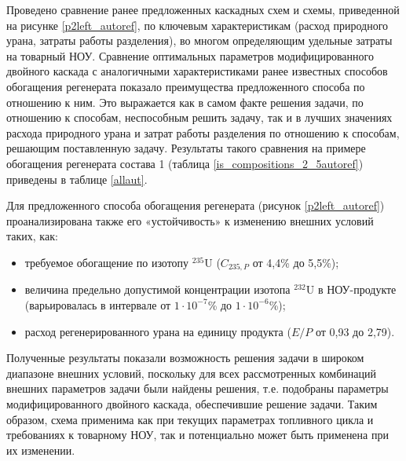 Проведено сравнение ранее предложенных каскадных схем и схемы, приведенной на рисунке \ref{p2left_autoref}, по ключевым характеристикам (расход природного урана, затраты работы разделения), во многом определяющим удельные затраты на товарный НОУ. Сравнение оптимальных параметров модифицированного двойного каскада с аналогичными характеристиками ранее известных способов обогащения регенерата показало преимущества предложенного способа по отношению к ним. Это выражается как в самом факте решения задачи, по отношению к способам, неспособным решить задачу, так и в лучших значениях расхода природного урана и затрат работы разделения по отношению к способам, решающим поставленную задачу. Результаты такого сравнения на примере обогащения регенерата состава 1 (таблица \ref{is_compositions_2_5autoref}) приведены в таблице \ref{allaut}. 

Для предложенного способа обогащения регенерата (рисунок \ref{p2left_autoref}) проанализирована также его «устойчивость» к изменению внешних условий таких, как:
\begin{itemize}
  \item требуемое обогащение по изотопу $^{235}$U ($C_{235,P}$ от  4,4\% до  5,5\%);    
  \item величина предельно допустимой концентрации изотопа $^{232}$U в НОУ-продукте (варьировалась в интервале от $1\cdot10^{-7}$\% до $1\cdot10^{-6}$\%);
  \item расход регенерированного урана на единицу продукта ($E/P$ от 0,93 до 2,79).
\end{itemize}

Полученные результаты показали возможность решения задачи в широком диапазоне внешних условий, поскольку для всех рассмотренных комбинаций внешних параметров задачи были найдены решения, т.е. подобраны параметры модифицированного двойного каскада, обеспечившие решение задачи. Таким образом, схема применима как при текущих параметрах топливного цикла и требованиях к товарному НОУ, так и потенциально может быть применена при их изменении.

